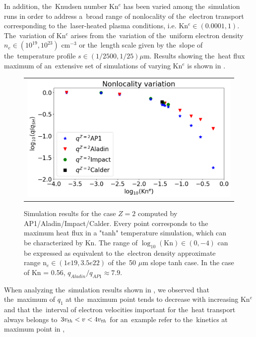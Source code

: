 In addition, the~Knudsen number Kn$^e$ has been varied among the~simulation 
runs in order to address a~broad range of nonlocality of 
the~electron transport corresponding 
to the~laser-heated plasma conditions, i.e. Kn$^e \in (0.0001, 1)$. 
The~variation of Kn$^e$ arises from the~variation
of the~uniform electron density $n_e \in (10^{19}, 10^{23})$ cm$^{-3}$ or 
the~length scale given by the~slope of the~temperature profile 
$s \in (1/2500, 1/25) \mu$m. Results showing the~heat flux maximum 
of an~extensive set of simulations of
varying Kn$^e$ is shown in .
 
\begin{figure}[htb]
  \begin{center}
    \begin{tabular}{c}
      \includegraphics[width=\figscale\textwidth]{Kn_results.png}
    \end{tabular}
  \caption{  
  Simulation results for the case $Z=2$ computed by AP1/Aladin/Impact/Calder.
  Every point corresponds to the maximum heat flux in a "tanh" temperature 
  simulation, which can be characterized by Kn. The range of 
  $\log_{10}(\text{Kn})\in (0, -4)$ can be expressed as equivalent 
  to the~electron density approximate range n$_e \in (1e19, 3.5e22)$ of 
  the~50 $\mu$m slope tanh case. In the case of Kn = 0.56, 
  $q_{Aladin} / q_{AP1}\approx 7.9$.}
  \label{fig:Kn_results}
  \end{center} 
\end{figure}
When analyzing the~simulation results shown in , 
we observed that 
the~maximum of $q_1$ at the~maximum point tends to decrease with increasing 
Kn$^e$ and that the~interval of electron velocities important for 
the~heat transport always belongs to $3 v_{th} < v <4 v_{th}$ for an~example
refer to the~kinetics at maximum point in , 
